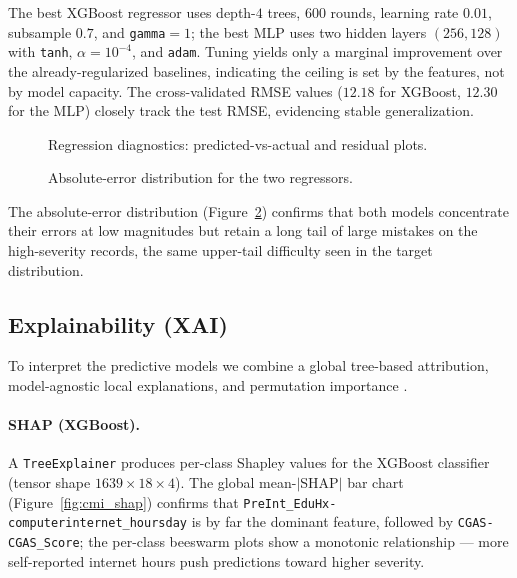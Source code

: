 The best XGBoost regressor uses depth-$4$ trees, $600$ rounds, learning rate $0.01$, subsample $0.7$, and \texttt{gamma}$=1$; the best MLP uses two hidden layers $(256,128)$ with \texttt{tanh}, $\alpha=10^{-4}$, and \texttt{adam}. Tuning yields only a marginal improvement over the already-regularized baselines, indicating the ceiling is set by the features, not by model capacity. The cross-validated RMSE values ($12.18$ for XGBoost, $12.30$ for the MLP) closely track the test RMSE, evidencing stable generalization.

\begin{figure}[h]
    \centering
    \caption{Regression diagnostics: predicted-vs-actual and residual plots.}
    \label{fig:cmi_reg_diag}
\end{figure}

\begin{figure}[h]
    \centering
    \caption{Absolute-error distribution for the two regressors.}
    \label{fig:cmi_abserr}
\end{figure}

The absolute-error distribution (Figure~\ref{fig:cmi_abserr}) confirms that both models concentrate their errors at low magnitudes but retain a long tail of large mistakes on the high-severity records, the same upper-tail difficulty seen in the target distribution.

\subsection{Explainability (XAI)}
To interpret the predictive models we combine a global tree-based attribution, model-agnostic local explanations, and permutation importance \cite{shap,lime}.\\

\paragraph{SHAP (XGBoost).} A \texttt{TreeExplainer} produces per-class Shapley values for the XGBoost classifier (tensor shape $1639\times18\times4$). The global mean-$|$SHAP$|$ bar chart (Figure~\ref{fig:cmi_shap}) confirms that \texttt{PreInt\_EduHx-computerinternet\_hoursday} is by far the dominant feature, followed by \texttt{CGAS-CGAS\_Score}; the per-class beeswarm plots show a monotonic relationship --- more self-reported internet hours push predictions toward higher severity.\\

